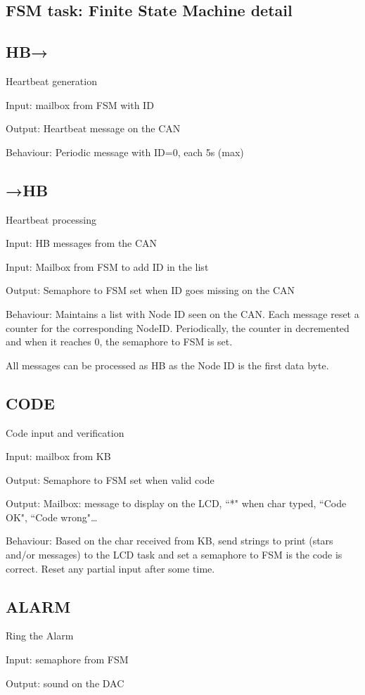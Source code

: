 \documentclass[10pt,a4paper]{article}
\theoremstyle{definition}%
\begin{document}
\subsection{FSM task: Finite State Machine detail}

\subsection{HB→}
Heartbeat generation

Input: mailbox from FSM with ID

Output: Heartbeat message on the CAN

Behaviour: Periodic message with ID=0, each 5s (max)
\subsection{→HB}
Heartbeat processing

Input: HB messages from the CAN

Input: Mailbox from FSM to add ID in the list

Output: Semaphore to FSM set when ID goes missing on the CAN

Behaviour: Maintains a list with Node ID seen on the CAN. Each message reset a counter for the corresponding NodeID. Periodically, the counter in decremented and when it reaches 0, the semaphore to FSM is set.

All messages can be processed as HB as the Node ID is the first data byte.
\subsection{CODE}
Code input and verification

Input: mailbox from KB

Output: Semaphore to FSM set when valid code

Output: Mailbox: message to display on the LCD, ``*" when char typed, ``Code OK", ``Code wrong"\dots

Behaviour: Based on the char received from KB, send strings to print (stars and/or messages) to the LCD task and set a semaphore to FSM is the code is correct. Reset any partial input after some time.
\subsection{ALARM}
Ring the Alarm

Input: semaphore from FSM

Output: sound on the DAC
\end{document}
